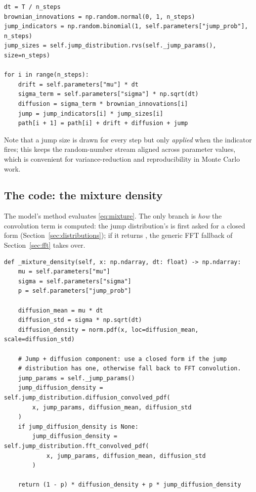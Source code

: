 \begin{lstlisting}[caption={Path simulation in \code{models/jump\_diffusion.py} (excerpt).}]
dt = T / n_steps
brownian_innovations = np.random.normal(0, 1, n_steps)
jump_indicators = np.random.binomial(1, self.parameters["jump_prob"], n_steps)
jump_sizes = self.jump_distribution.rvs(self._jump_params(), size=n_steps)

for i in range(n_steps):
    drift = self.parameters["mu"] * dt
    sigma_term = self.parameters["sigma"] * np.sqrt(dt)
    diffusion = sigma_term * brownian_innovations[i]
    jump = jump_indicators[i] * jump_sizes[i]
    path[i + 1] = path[i] + drift + diffusion + jump
\end{lstlisting}

Note that a jump size is drawn for every step but only \emph{applied} when
the indicator fires; this keeps the random-number stream aligned across
parameter values, which is convenient for variance-reduction and
reproducibility in Monte Carlo work.

\subsection{The code: the mixture density}

The model's  method evaluates \eqref{eq:mixture}.
The only branch is \emph{how} the convolution term is computed: the jump
distribution's  is first asked for a
closed form (Section~\ref{sec:distributions}); if it returns ,
the generic FFT fallback of Section~\ref{sec:fft} takes over.

\begin{lstlisting}[caption={The mixture density \eqref{eq:mixture} in \code{models/jump\_diffusion.py}.}]
def _mixture_density(self, x: np.ndarray, dt: float) -> np.ndarray:
    mu = self.parameters["mu"]
    sigma = self.parameters["sigma"]
    p = self.parameters["jump_prob"]

    diffusion_mean = mu * dt
    diffusion_std = sigma * np.sqrt(dt)
    diffusion_density = norm.pdf(x, loc=diffusion_mean, scale=diffusion_std)

    # Jump + diffusion component: use a closed form if the jump
    # distribution has one, otherwise fall back to FFT convolution.
    jump_params = self._jump_params()
    jump_diffusion_density = self.jump_distribution.diffusion_convolved_pdf(
        x, jump_params, diffusion_mean, diffusion_std
    )
    if jump_diffusion_density is None:
        jump_diffusion_density = self.jump_distribution.fft_convolved_pdf(
            x, jump_params, diffusion_mean, diffusion_std
        )

    return (1 - p) * diffusion_density + p * jump_diffusion_density
\end{lstlisting}

